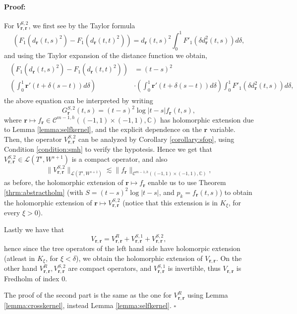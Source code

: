 \documentclass{article}
\newenvironment{proof}{\paragraph{Proof:}}{\hfill$\square$}
\newcommand{\IC}{{\mathbb C}}
\newcommand{\cmspaceh}[4]{\mathcal{C}^{#1,#2} \left( #3, #4 \right)}
\newcommand{\br}{\bm{r}}
\newcommand{\iinterv}{(-1,1)\times(-1,1)}
\begin{document}
\begin{proof}
For $V^{S,2}_{\br,\br}$, we first see by the Taylor formula
$$
(F_1(d_{\br}(t,s)^2)-F_1(d_{\br}(t,t)^2)) = d_{\br}(t,s)^2\int_{0}^1 F'_1(\delta d^2_{\br}(t,s))d\delta,
$$
and using the Taylor expansion of the distance function we obtain,
\begin{align*}
\begin{split}
(F_1(d_{\br}(t,s)^2)-F_1(d_{\br}(t,t)^2)) &= (t-s)^2 \\ \left(\int_{0}^1 \br'(t+\delta(s-t))d\delta \right) &\cdot \left(\int_{0}^1 \br'(t+\delta(s-t))d\delta \right)\int_{0}^1 F'_1(\delta d^2_{\br}(t,s))d\delta,
\end{split}
\end{align*}
the above equation can be interpreted  by writing 
$$G_{\br}^{S,2}(t,s) = (t-s)^2 \log|t-s| f_{\br}(t,s),$$
where $\br \mapsto f_{\br} \in \cmspaceh{m-1}{h}{\iinterv}{\IC}$ has holomorphic extension due to Lemma \ref{lemma:selfkernel}, and the explicit dependence on the $\br$  variable. Then, the operator $V_{\br,\br}^{S,2}$ can be analyzed by Corollary \ref{corollary:sfop}, using Condition \ref{condition:smh} to verify the hypotesis. Hence we get that $V_{\br,\br}^{S,2} \in \mathcal{L}
\left(T^s,W^{s+1}\right) $ is a compact operator, and also 
$$
\|V_{\br,\br}^{S,2}\|_{\mathcal{L}
\left(T^s,W^{s+1}\right)} \lesssim \|f_{\br}\|_{\cmspaceh{m-1}{h}{\iinterv}{\IC}},
$$
as before, the holomorphic extension of $\br \mapsto f_{\br}$ enable us to use Theorem \ref{thrm:abstractholm} (with  $S=(t-s)^2\log |t-s|$, and $p_k = f_{\br}(t,s)$) to obtain the holomorphic extension of $\br \mapsto V_{\br,\br}^{S,2}$ (notice that this extension is in $K_\xi$, for every $\xi >0$).

Lastly we have that 
$$
V_{\br,\br} =V_{\br,\br}^{R}+V_{\br,\br}^{S,1} + V_{\br,\br}^{S,2},
$$
hence since the tree operators of the left hand side have holomorpic extension (atleast in $K_\xi$, for $\xi < \delta$), we obtain the holomorphic extension of $V_{\br,\br}$. On the other hand $V_{\br,\br}^{R}, V_{\br,\br}^{S,2}$ are compact operators, and $V_{\br,\br}^{S,1}$ is invertible, thus 
$V_{\br,\br}$ is Fredholm of index 0.

The proof of the second part is the same as the one for $V^R_{\br,\br}$ using Lemma \ref{lemma:crosskernel}, instead Lemma \ref{lemma:selfkernel}.
\end{proof}
\end{document}
